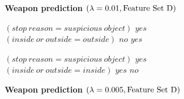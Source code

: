 \begin{figure}[b!]
\textbf{Weapon prediction $({\lambda} = 0.01, \text{Feature Set~D})$}
\vspace{1mm}
\begin{algorithmic}
\State \bif $(stop~reason = suspicious~object)$ \bthen $yes$ 
\State \belif $(inside~or~outside = outside)$ \bthen $no$
\State \belse $yes$
\end{algorithmic}
\vspace{1mm}
\begin{algorithmic}
\State \bif $(stop~reason = suspicious~object)$ \bthen $yes$ 
\State \belif $(inside~or~outside = inside)$ \bthen $yes$
\State \belse $no$
\end{algorithmic}
\vspace{5mm}
%
\textbf{Weapon prediction $({\lambda} = 0.005, \text{Feature Set~D})$}
\vspace{1mm}

\end{figure}
